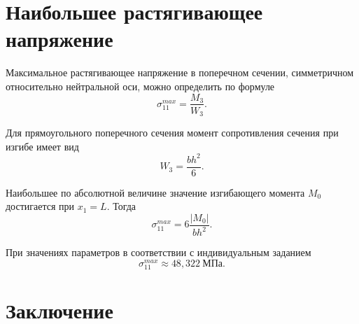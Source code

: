 \documentclass[12pt, a4paper]{article}
\begin{document}
	\section{Наибольшее растягивающее напряжение}
	
	Максимальное растягивающее напряжение в поперечном сечении, симметричном относительно нейтральной оси, можно определить по формуле
	\[
	\sigma_{11}^{max} = \frac{M_3}{W_3}.
	\]
	
	Для прямоугольного поперечного сечения момент сопротивления сечения при изгибе имеет вид
	\[
	W_3 = \frac{b h^2}{6}.
	\]
	
	Наибольшее по абсолютной величине значение изгибающего момента $M_0$ достигается при $x_1 = L$. Тогда 
	\[
	\sigma_{11}^{max} = 6 \frac{|M_0|}{b h^2}.
	\]
	
	При значениях параметров в соответствии с индивидуальным заданием
	\[
	\sigma_{11}^{max} \approx 48{,}322 \ \text{МПа}.
	\]
	
	\newpage
	\section{Заключение}
	
\end{document}
